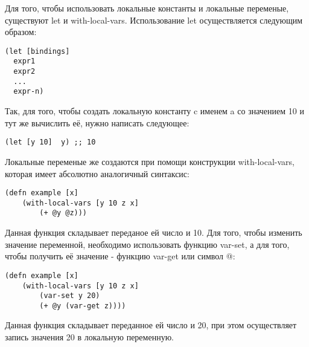 Для того, чтобы использовать локальные константы и локальные переменые, существуют let и with-local-vars. Использование let осуществляется следующим образом:

\begin{center}
	\captionsetup{justification=raggedright,singlelinecheck=off}
	\begin{lstlisting}[label=lst:let_usage,caption=Правило использования let]
(let [bindings]
  expr1
  expr2
  ...
  expr-n)
	\end{lstlisting}
\end{center}

Так, для того, чтобы создать локальную константу c именем a со значением 10 и тут же вычислить её, нужно написать следующее:
\begin{center}
	\captionsetup{justification=raggedright,singlelinecheck=off}
	\begin{lstlisting}[label=lst:let_usage-1,caption=Пример использования let]
(let [y 10]  y) ;; 10
	\end{lstlisting}
\end{center}

Локальные переменые же создаются при помощи конструкции with-local-vars, которая имеет абсолютно аналогичный синтаксис:

\begin{center}
	\captionsetup{justification=raggedright,singlelinecheck=off}
	\begin{lstlisting}[label=lst:with-local-vars,caption=Пример использования with-local-vars]
(defn example [x]
	(with-local-vars [y 10 z x]
		(+ @y @z)))
	\end{lstlisting}
\end{center}

Данная функция складывает переданое ей число и 10. Для того, чтобы изменить значение переменной, необходимо использовать функцию var-set, а для того, чтобы получить её значение - функцию var-get или символ @:

\begin{center}
	\captionsetup{justification=raggedright,singlelinecheck=off}
	\begin{lstlisting}[label=lst:with-local-vars,caption=Пример использования with-local-vars]
(defn example [x]
	(with-local-vars [y 10 z x]
		(var-set y 20)
		(+ @y (var-get z))))
	\end{lstlisting}
\end{center}

Данная функция складывает переданное ей число и 20, при этом осуществляет запись значения 20 в локальную переменную.


